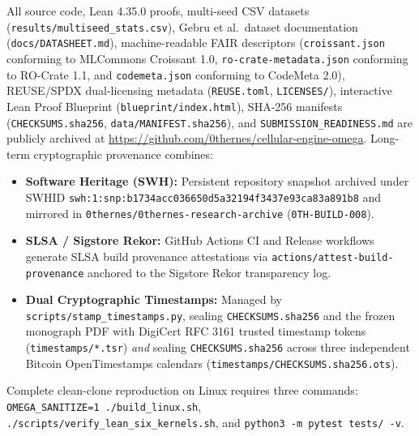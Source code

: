 \documentclass[11pt,reqno]{amsart}
\begin{document}
All source code, Lean 4.35.0 proofs, multi-seed CSV datasets (\nolinkurl{results/multiseed_stats.csv}), Gebru et al.\ dataset documentation (\nolinkurl{docs/DATASHEET.md}), machine-readable FAIR descriptors (\texttt{croissant.json} conforming to MLCommons Croissant 1.0, \texttt{ro-crate-metadata.json} conforming to RO-Crate 1.1, and \texttt{codemeta.json} conforming to CodeMeta 2.0), REUSE/SPDX dual-licensing metadata (\texttt{REUSE.toml}, \texttt{LICENSES/}), interactive Lean Proof Blueprint (\nolinkurl{blueprint/index.html}), SHA-256 manifests (\texttt{CHECKSUMS.sha256}, \nolinkurl{data/MANIFEST.sha256}), and \nolinkurl{SUBMISSION_READINESS.md} are publicly archived at \url{https://github.com/0thernes/cellular-engine-omega}. Long-term cryptographic provenance combines:
\begin{itemize}
  \item \textbf{Software Heritage (SWH):} Persistent repository snapshot archived under SWHID \nolinkurl{swh:1:snp:b1734acc036650d5a32194f3437e93ca83a891b8} and mirrored in \nolinkurl{0thernes/0thernes-research-archive} (\texttt{0TH-BUILD-008}).
  \item \textbf{SLSA / Sigstore Rekor:} GitHub Actions CI and Release workflows generate SLSA build provenance attestations via \nolinkurl{actions/attest-build-provenance} anchored to the Sigstore Rekor transparency log.
  \item \textbf{Dual Cryptographic Timestamps:} Managed by \nolinkurl{scripts/stamp_timestamps.py}, sealing \nolinkurl{CHECKSUMS.sha256} and the frozen monograph PDF with DigiCert RFC 3161 trusted timestamp tokens (\nolinkurl{timestamps/*.tsr}) \emph{and} sealing \nolinkurl{CHECKSUMS.sha256} across three independent Bitcoin OpenTimestamps calendars (\nolinkurl{timestamps/CHECKSUMS.sha256.ots}).
\end{itemize}
Complete clean-clone reproduction on Linux requires three commands: \nolinkurl{OMEGA_SANITIZE=1 ./build_linux.sh}, \nolinkurl{./scripts/verify_lean_six_kernels.sh}, and \nolinkurl{python3 -m pytest tests/ -v}.
\end{document}
